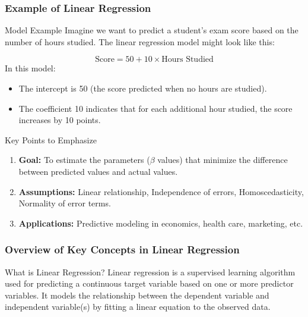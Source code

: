 \documentclass[aspectratio=169]{beamer}
\begin{document}
\begin{frame}[fragile]
    \frametitle{Example of Linear Regression}
    \begin{block}{Model Example}
        Imagine we want to predict a student's exam score based on the number of hours studied. The linear regression model might look like this:
    \end{block}
    \begin{equation}
        \text{Score} = 50 + 10 \times \text{Hours Studied}
    \end{equation}
    In this model:
    \begin{itemize}
        \item The intercept is 50 (the score predicted when no hours are studied).
        \item The coefficient 10 indicates that for each additional hour studied, the score increases by 10 points.
    \end{itemize}
    \begin{block}{Key Points to Emphasize}
        \begin{enumerate}
            \item \textbf{Goal:} To estimate the parameters (\( \beta \) values) that minimize the difference between predicted values and actual values.
            \item \textbf{Assumptions:} Linear relationship, Independence of errors, Homoscedasticity, Normality of error terms.
            \item \textbf{Applications:} Predictive modeling in economics, health care, marketing, etc.
        \end{enumerate}
    \end{block}
\end{frame}

\begin{frame}[fragile]
    \frametitle{Overview of Key Concepts in Linear Regression}
    \begin{block}{What is Linear Regression?}
        Linear regression is a supervised learning algorithm used for predicting a continuous target variable based on one or more predictor variables. It models the relationship between the dependent variable and independent variable(s) by fitting a linear equation to the observed data.
    \end{block}
\end{frame}
\end{document}

